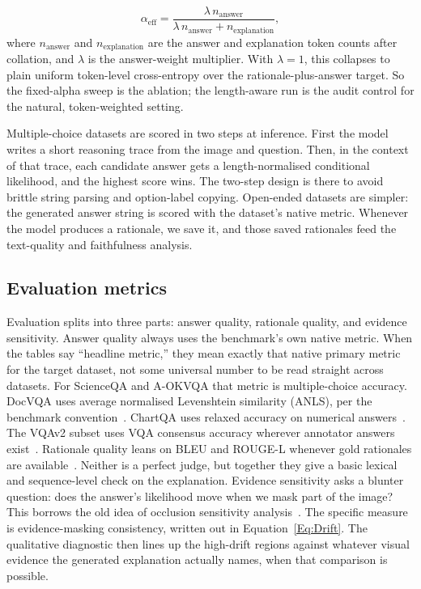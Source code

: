 \documentclass[preprint,12pt]{elsarticle}
\begin{document}
\begin{equation}
    \alpha_{\text{eff}} =
    \frac{\lambda\,n_{\text{answer}}}{\lambda\,n_{\text{answer}} + n_{\text{explanation}}},
    \label{Eq:LengthAlpha}
\end{equation}
where $n_{\text{answer}}$ and $n_{\text{explanation}}$ are the answer and explanation token counts after collation, and $\lambda$ is the answer-weight multiplier.
With $\lambda=1$, this collapses to plain uniform token-level cross-entropy over the rationale-plus-answer target.
So the fixed-alpha sweep is the ablation; the length-aware run is the audit control for the natural, token-weighted setting.

Multiple-choice datasets are scored in two steps at inference.
First the model writes a short reasoning trace from the image and question.
Then, in the context of that trace, each candidate answer gets a length-normalised conditional likelihood, and the highest score wins.
The two-step design is there to avoid brittle string parsing and option-label copying.
Open-ended datasets are simpler: the generated answer string is scored with the dataset's native metric.
Whenever the model produces a rationale, we save it, and those saved rationales feed the text-quality and faithfulness analysis.

\subsection{Evaluation metrics}
Evaluation splits into three parts: answer quality, rationale quality, and evidence sensitivity.
Answer quality always uses the benchmark's own native metric.
When the tables say ``headline metric,'' they mean exactly that native primary metric for the target dataset, not some universal number to be read straight across datasets.
For ScienceQA and A-OKVQA that metric is multiple-choice accuracy.
DocVQA uses average normalised Levenshtein similarity (ANLS), per the benchmark convention~\cite{mathew2021docvqa}.
ChartQA uses relaxed accuracy on numerical answers~\cite{masry2022chartqa}.
The VQAv2 subset uses VQA consensus accuracy wherever annotator answers exist~\cite{antol2015vqa,goyal2017vqav2}.
Rationale quality leans on BLEU and ROUGE-L whenever gold rationales are available~\cite{papineni2002bleu,lin2004rouge}.
Neither is a perfect judge, but together they give a basic lexical and sequence-level check on the explanation.
Evidence sensitivity asks a blunter question: does the answer's likelihood move when we mask part of the image? This borrows the old idea of occlusion sensitivity analysis~\cite{zeiler2014visualizing}.
The specific measure is evidence-masking consistency, written out in Equation~\ref{Eq:Drift}.
The qualitative diagnostic then lines up the high-drift regions against whatever visual evidence the generated explanation actually names, when that comparison is possible.
\end{document}
